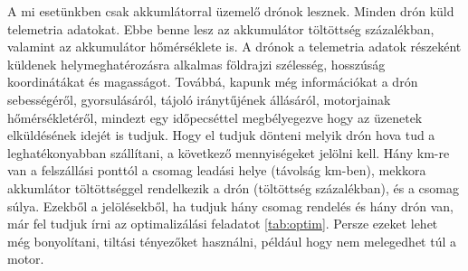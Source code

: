 A mi esetünkben csak akkumlátorral üzemelő drónok lesznek.
Minden drón küld telemetria adatokat.
Ebbe benne lesz az akkumulátor töltöttség százalékban, valamint az akkumulátor hőmérséklete is.
A drónok a telemetria adatok részeként küldenek helymeghatérozásra alkalmas földrajzi szélesség, hosszúság koordinátákat és magasságot.
Továbbá, kapunk még információkat a drón sebességéről,
gyorsulásáról, tájoló iránytűjének állásáról, motorjainak hőmérsékletéről, mindezt egy időpecséttel megbélyegezve hogy az üzenetek elküldésének idejét is tudjuk.
Hogy el tudjuk dönteni melyik drón hova tud a leghatékonyabban szállítani, a következő mennyiségeket jelölni kell. Hány km-re van a felszállási ponttól a csomag leadási helye (távolság km-ben),
mekkora akkumlátor töltöttséggel rendelkezik a drón (töltöttség százalékban), és a csomag súlya.
Ezekből a jelölésekből, ha tudjuk hány csomag rendelés és hány drón van, már fel tudjuk írni az optimalizálási feladatot \ref{tab:optim}.
Persze ezeket lehet még bonyolítani, tiltási tényezőket használni, például hogy nem melegedhet túl a motor.

